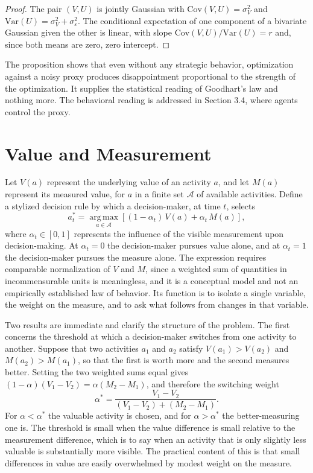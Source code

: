 \documentclass[11pt]{report}
\theoremstyle{definition}
\theoremstyle{remark}
\newcommand{\cA}{\mathcal{A}}
\newcommand{\argmax}{\operatorname*{arg\,max}}
\begin{document}
\begin{proof}
The pair $(V,U)$ is jointly Gaussian with $\mathrm{Cov}(V,U)=\sigma_V^2$ and $\mathrm{Var}(U)=\sigma_V^2+\sigma_\varepsilon^2$. The conditional expectation of one component of a bivariate Gaussian given the other is linear, with slope $\mathrm{Cov}(V,U)/\mathrm{Var}(U)=r$ and, since both means are zero, zero intercept.
\end{proof}

The proposition shows that even without any strategic behavior, optimization against a noisy proxy produces disappointment proportional to the strength of the optimization. It supplies the statistical reading of Goodhart's law and nothing more. The behavioral reading is addressed in Section 3.4, where agents control the proxy.

\section{Value and Measurement}

Let $V(a)$ represent the underlying value of an activity $a$, and let $M(a)$ represent its measured value, for $a$ in a finite set $\cA$ of available activities. Define a stylized decision rule by which a decision-maker, at time $t$, selects
\[
a_t^\ast=\argmax_{a\in\cA}\left[(1-\alpha_t)\,V(a)+\alpha_t\,M(a)\right],
\]
where $\alpha_t\in[0,1]$ represents the influence of the visible measurement upon decision-making. At $\alpha_t=0$ the decision-maker pursues value alone, and at $\alpha_t=1$ the decision-maker pursues the measure alone. The expression requires comparable normalization of $V$ and $M$, since a weighted sum of quantities in incommensurable units is meaningless, and it is a conceptual model and not an empirically established law of behavior. Its function is to isolate a single variable, the weight on the measure, and to ask what follows from changes in that variable.

Two results are immediate and clarify the structure of the problem. The first concerns the threshold at which a decision-maker switches from one activity to another. Suppose that two activities $a_1$ and $a_2$ satisfy $V(a_1)>V(a_2)$ and $M(a_2)>M(a_1)$, so that the first is worth more and the second measures better. Setting the two weighted sums equal gives $(1-\alpha)(V_1-V_2)=\alpha(M_2-M_1)$, and therefore the switching weight
\[
\alpha^\ast=\frac{V_1-V_2}{(V_1-V_2)+(M_2-M_1)} .
\]
For $\alpha<\alpha^\ast$ the valuable activity is chosen, and for $\alpha>\alpha^\ast$ the better-measuring one is. The threshold is small when the value difference is small relative to the measurement difference, which is to say when an activity that is only slightly less valuable is substantially more visible. The practical content of this is that small differences in value are easily overwhelmed by modest weight on the measure.
\end{document}
